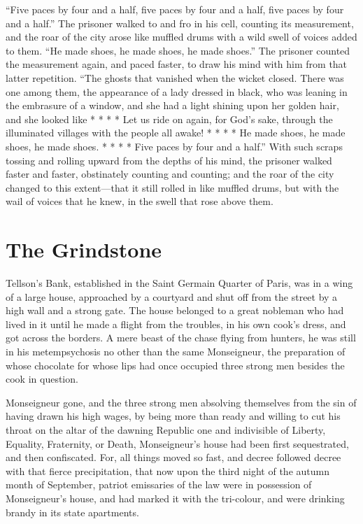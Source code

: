 ``Five paces by four and a half, five paces by four and a half, five
paces by four and a half.''  The prisoner walked to and fro in his
cell, counting its measurement, and the roar of the city arose like
muffled drums with a wild swell of voices added to them.  ``He made
shoes, he made shoes, he made shoes.''  The prisoner counted the
measurement again, and paced faster, to draw his mind with him from
that latter repetition.  ``The ghosts that vanished when the wicket
closed.  There was one among them, the appearance of a lady dressed
in black, who was leaning in the embrasure of a window, and she had a
light shining upon her golden hair, and she looked like * * * * Let
us ride on again, for God's sake, through the illuminated villages
with the people all awake! * * * * He made shoes, he made shoes,
he made shoes. * * * * Five paces by four and a half.''  With such scraps
tossing and rolling upward from the depths of his mind, the prisoner
walked faster and faster, obstinately counting and counting; and the
roar of the city changed to this extent---that it still rolled in like
muffled drums, but with the wail of voices that he knew, in the swell
that rose above them.



\chapter{The Grindstone}


Tellson's Bank, established in the Saint Germain Quarter of Paris,
was in a wing of a large house, approached by a courtyard and shut
off from the street by a high wall and a strong gate.  The house
belonged to a great nobleman who had lived in it until he made a
flight from the troubles, in his own cook's dress, and got across the
borders.  A mere beast of the chase flying from hunters, he was still
in his metempsychosis no other than the same Monseigneur, the
preparation of whose chocolate for whose lips had once occupied three
strong men besides the cook in question.

Monseigneur gone, and the three strong men absolving themselves from
the sin of having drawn his high wages, by being more than ready and
willing to cut his throat on the altar of the dawning Republic one and
indivisible of Liberty, Equality, Fraternity, or Death, Monseigneur's
house had been first sequestrated, and then confiscated.  For, all
things moved so fast, and decree followed decree with that fierce
precipitation, that now upon the third night of the autumn month of
September, patriot emissaries of the law were in possession of
Monseigneur's house, and had marked it with the tri-colour, and were
drinking brandy in its state apartments.

